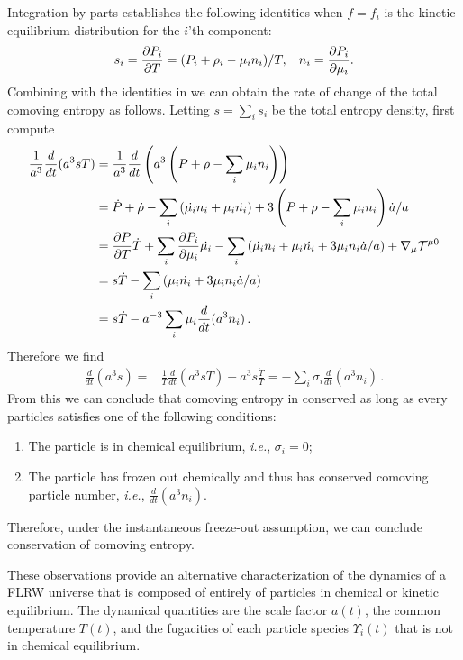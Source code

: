 Integration by parts establishes the following identities when $f=f_i$ is the kinetic equilibrium distribution  for the $i$'th component:
\begin{equation}\label{identities}
s_i=\frac{\partial P_i}{\partial T}=(P_i+\rho_i-\mu_i n_i)/T, \hspace{3mm} n_i=\frac{\partial P_i}{\partial \mu_i}.
\end{equation}
Combining  with the identities in  we can obtain the rate of change of the total comoving entropy as follows. Letting $s=\sum_i s_i$ be the total entropy density, first compute
\begin{align}\frac{1}{a^3}\frac{d}{dt}(a^3sT)&=\frac{1}{a^{3}}\frac{d}{dt}\left(a^3\left(P+\rho-\sum_i \mu_i n_i\right)\right)\\
&=\dot{P}+\dot{\rho}-\sum_i \left(\dot{\mu_i}n_i+\mu_i\dot{n_i}\right)+3\left(P+\rho-\sum_i \mu_i n_i\right)\dot{a}/a\notag\\
&=\frac{\partial P}{\partial T} \dot{T}+\sum_i\frac{\partial P_i}{\partial \mu_i} \dot{\mu_i}-\sum_i \left(\dot{\mu_i}n_i+\mu_i\dot{n_i}+3\mu_i n_i \dot{a}/a\right)+\nabla_\mu \mathcal{T}^{\mu 0}\notag\\
&=s\dot{T}-\sum_i \left(\mu_i\dot{n_i}+3\mu_i n_i \dot{a}/a\right)\notag\\
&=s\dot{T}- a^{-3}\sum_i\mu_i\frac{d}{dt}(a^3n_i)\,.\notag
\end{align}
Therefore we find
\begin{align}\label{S_n_eq}
\frac{d}{dt}(a^3s)=&\frac{1}{T}\frac{d}{dt}(a^3sT)-a^3s\frac{\dot T}{T}=-\sum_i\sigma_i\frac{d}{dt}(a^3n_i)\,.
\end{align}
From this we can conclude that comoving entropy in conserved as long as every particles satisfies one of the following conditions:
\begin{enumerate}
\item
The particle is in chemical equilibrium, {\it i.e.\/}, $\sigma_i= 0$;
\item
The particle has frozen out chemically and thus has conserved comoving particle number, {\it i.e.\/}, $\frac{d}{dt}(a^3n_i)$. 
\end{enumerate}
Therefore, under the instantaneous freeze-out assumption, we can conclude conservation of comoving entropy. 

These observations provide an alternative characterization of the dynamics of a FLRW universe that is composed of entirely of particles in chemical or kinetic equilibrium. The dynamical quantities are the scale factor $a(t)$, the common temperature $T(t)$, and the fugacities of each particle species $\Upsilon_i(t)$ that is not in chemical equilibrium. 

